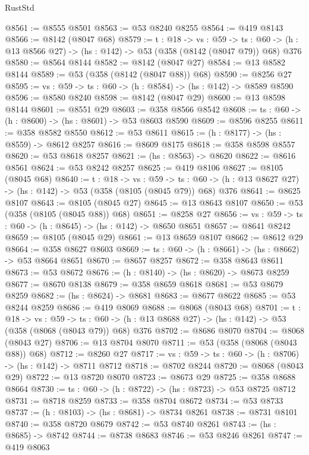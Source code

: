 \begin{lexlean}{RustStd}
\begin{coremodule}
@8561 := @8555 @8501
@8563 := @53 @8240 @8255
@8564 := @419 @8143
@8566 := @8142 (@8047 @68)
@8579 := {t : @18} ->
  {vs : @59} ->
  {ts : @60} -> (h : @13 @8566 @27) -> (hs : @142) -> @53 (@358 (@8142 (@8047 @79)) @68) @376
@8580 := @8564 @8144
@8582 := @8142 (@8047 @27)
@8584 := @13 @8582 @8144
@8589 := @53 (@358 (@8142 (@8047 @88)) @68)
@8590 := @8256 @27
@8595 := {vs : @59} -> {ts : @60} -> (h : @8584) -> (hs : @142) -> @8589 @8590
@8596 := @8580 @8240
@8598 := @8142 (@8047 @29)
@8600 := @13 @8598 @8144
@8601 := @8551 @29
@8603 := @358 @8566 @8542
@8608 := {ts : @60} -> (h : @8600) -> (hs : @8601) -> @53 @8603 @8590
@8609 := @8596 @8255
@8611 := @358 @8582 @8550
@8612 := @53 @8611
@8615 := (h : @8177) -> (hs : @8559) -> @8612 @8257
@8616 := @8609 @8175
@8618 := @358 @8598 @8557
@8620 := @53 @8618 @8257
@8621 := (hs : @8563) -> @8620
@8622 := @8616 @8561
@8624 := @53 @8242 @8257
@8625 := @419 @8106
@8627 := @8105 (@8045 @68)
@8640 := {t : @18} ->
  {vs : @59} ->
  {ts : @60} -> (h : @13 @8627 @27) -> (hs : @142) -> @53 (@358 (@8105 (@8045 @79)) @68) @376
@8641 := @8625 @8107
@8643 := @8105 (@8045 @27)
@8645 := @13 @8643 @8107
@8650 := @53 (@358 (@8105 (@8045 @88)) @68)
@8651 := @8258 @27
@8656 := {vs : @59} -> {ts : @60} -> (h : @8645) -> (hs : @142) -> @8650 @8651
@8657 := @8641 @8242
@8659 := @8105 (@8045 @29)
@8661 := @13 @8659 @8107
@8662 := @8612 @29
@8664 := @358 @8627 @8603
@8669 := {ts : @60} -> (h : @8661) -> (hs : @8662) -> @53 @8664 @8651
@8670 := @8657 @8257
@8672 := @358 @8643 @8611
@8673 := @53 @8672
@8676 := (h : @8140) -> (hs : @8620) -> @8673 @8259
@8677 := @8670 @8138
@8679 := @358 @8659 @8618
@8681 := @53 @8679 @8259
@8682 := (hs : @8624) -> @8681
@8683 := @8677 @8622
@8685 := @53 @8244 @8259
@8686 := @419 @8069
@8688 := @8068 (@8043 @68)
@8701 := {t : @18} ->
  {vs : @59} ->
  {ts : @60} -> (h : @13 @8688 @27) -> (hs : @142) -> @53 (@358 (@8068 (@8043 @79)) @68) @376
@8702 := @8686 @8070
@8704 := @8068 (@8043 @27)
@8706 := @13 @8704 @8070
@8711 := @53 (@358 (@8068 (@8043 @88)) @68)
@8712 := @8260 @27
@8717 := {vs : @59} -> {ts : @60} -> (h : @8706) -> (hs : @142) -> @8711 @8712
@8718 := @8702 @8244
@8720 := @8068 (@8043 @29)
@8722 := @13 @8720 @8070
@8723 := @8673 @29
@8725 := @358 @8688 @8664
@8730 := {ts : @60} -> (h : @8722) -> (hs : @8723) -> @53 @8725 @8712
@8731 := @8718 @8259
@8733 := @358 @8704 @8672
@8734 := @53 @8733
@8737 := (h : @8103) -> (hs : @8681) -> @8734 @8261
@8738 := @8731 @8101
@8740 := @358 @8720 @8679
@8742 := @53 @8740 @8261
@8743 := (hs : @8685) -> @8742
@8744 := @8738 @8683
@8746 := @53 @8246 @8261
@8747 := @419 @8063

\end{coremodule}
\end{lexlean}
